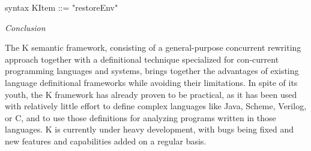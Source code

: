 \documentclass{article}
\begin{document}
\noindent{}
\noindent{}\newline
\newline
\newline
syntax KItem ::= "restoreEnv"
\noindent{}
\noindent{}\newline\newline

\textit{Conclusion}
\newline

 \qquad The K semantic framework,  consisting of a general-purpose concurrent rewriting approach together with a definitional technique specialized for con-current programming languages and systems, brings together the advantages of existing language definitional frameworks while avoiding their limitations. In spite of its youth, the K framework has already proven to be practical, as it has been used with relatively little effort to define complex languages like Java, Scheme, Verilog, or C, and to use those definitions for analyzing programs written in those languages. K is currently under heavy development, with bugs being fixed and new features and capabilities added on a regular basis.\newline\newline
\end{document}
